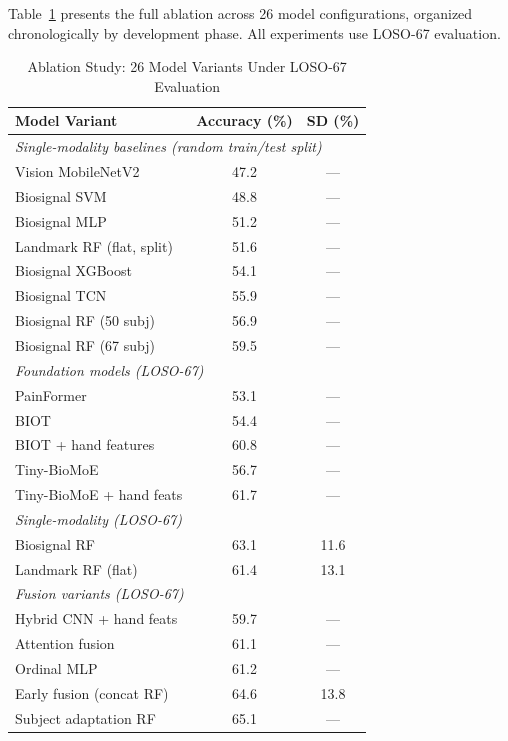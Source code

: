 \documentclass[10pt, twocolumn]{article}
\begin{document}
Table~\ref{tab:ablation} presents the full ablation across 26 model configurations,
organized chronologically by development phase. All experiments use LOSO-67 evaluation.

\begin{table}[htbp]
\centering
\caption{Ablation Study: 26 Model Variants Under LOSO-67 Evaluation}
\label{tab:ablation}
\small
\begin{tabular}{lcc}
\toprule
\textbf{Model Variant} & \textbf{Accuracy (\%)} & \textbf{SD (\%)} \\
\midrule
\multicolumn{3}{l}{\textit{Single-modality baselines (random train/test split)}} \\
Vision MobileNetV2        & 47.2 & --- \\
Biosignal SVM             & 48.8 & --- \\
Biosignal MLP             & 51.2 & --- \\
Landmark RF (flat, split) & 51.6 & --- \\
Biosignal XGBoost         & 54.1 & --- \\
Biosignal TCN             & 55.9 & --- \\
Biosignal RF (50 subj)    & 56.9 & --- \\
Biosignal RF (67 subj)    & 59.5 & --- \\
\midrule
\multicolumn{3}{l}{\textit{Foundation models (LOSO-67)}} \\
PainFormer                & 53.1 & --- \\
BIOT                      & 54.4 & --- \\
BIOT + hand features      & 60.8 & --- \\
Tiny-BioMoE               & 56.7 & --- \\
Tiny-BioMoE + hand feats  & 61.7 & --- \\
\midrule
\multicolumn{3}{l}{\textit{Single-modality (LOSO-67)}} \\
Biosignal RF              & 63.1 & 11.6 \\
Landmark RF (flat)        & 61.4 & 13.1 \\
\midrule
\multicolumn{3}{l}{\textit{Fusion variants (LOSO-67)}} \\
Hybrid CNN + hand feats   & 59.7 & --- \\
Attention fusion          & 61.1 & --- \\
Ordinal MLP               & 61.2 & --- \\
Early fusion (concat RF)  & 64.6 & 13.8 \\
Subject adaptation RF     & 65.1 & --- \\

\end{tabular}
\end{table}
\end{document}
